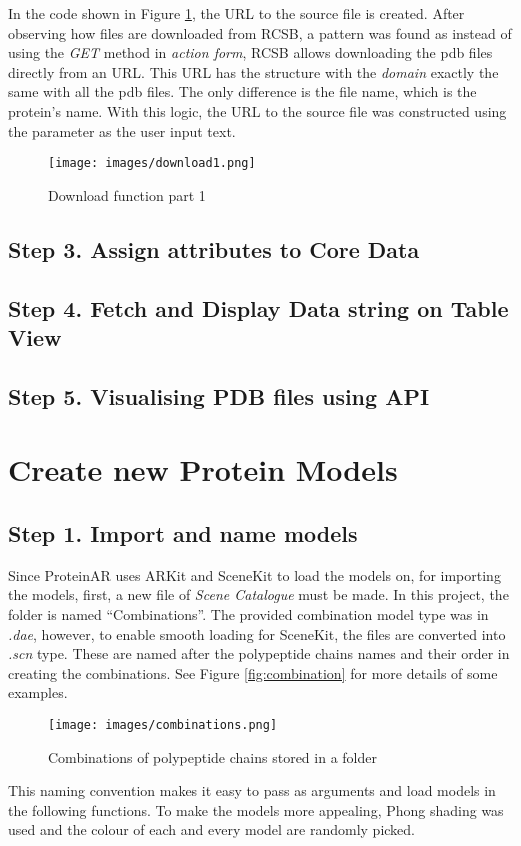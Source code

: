 In the code shown in Figure \ref{fig:download1}, the URL to the source file is created. After observing how files are downloaded from RCSB, a pattern was found as instead of using the \emph{GET} method in \emph{action form}, RCSB allows downloading the pdb files directly from an URL. This URL has the structure with the \emph{domain} exactly the same with all the pdb files. The only difference is the file name, which is the protein's name. With this logic, the URL to the source file was constructed using the parameter as the user input text. 
 \begin{figure}[!htp]
	\centering
	\texttt{[image: images/download1.png]}
	\caption{Download function part 1}
	\label{fig:download1}
\end{figure}

\subsection{Step 3. Assign attributes to Core Data}
\subsection{Step 4. Fetch and Display Data string on Table View}
\subsection{Step 5. Visualising PDB files using API}


\section{Create new Protein Models}
\subsection{Step 1. Import and name models}
Since ProteinAR uses ARKit and SceneKit to load the models on, for importing the models, first, a new file of \emph{Scene Catalogue} must be made. In this project, the folder is named “Combinations”. The provided combination model type was in \emph{.dae}, however, to enable smooth loading for SceneKit, the files are converted into \emph{.scn} type. These are named after the polypeptide chains names and their order in creating the combinations. See Figure \ref{fig:combination} for more details of some examples.
 \begin{figure}[!htp]
	\centering
	\texttt{[image: images/combinations.png]}
	\caption{Combinations of polypeptide chains stored in a folder}
	\label{fig:combinations}
\end{figure}
This naming convention makes it easy to pass as arguments and load models in the following functions. To make the models more appealing, Phong shading was used and the colour of each and every model are randomly picked. 

